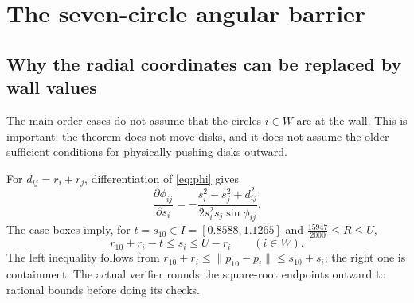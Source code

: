 \documentclass[11pt,a4paper]{article}
\theoremstyle{remark}
\newcommand{\Rcap}{U}
\newcommand{\norm}[1]{\lVert #1\rVert}
\begin{document}
\section{The seven-circle angular barrier}
\label{sec:barrier}

\subsection{Why the radial coordinates can be replaced by wall values}

The main order cases do not assume that the circles $i\in W$ are at the wall.
This is important: the theorem does not move disks, and it does not assume
the older sufficient conditions for physically pushing disks outward.

For $d_{ij}=r_i+r_j$, differentiation of \eqref{eq:phi} gives
\begin{equation}
 \frac{\partial\phi_{ij}}{\partial s_i}
  =-\frac{s_i^2-s_j^2+d_{ij}^2}
          {2s_i^2s_j\sin\phi_{ij}}.
 \label{eq:phi-derivative}
\end{equation}
The case boxes imply, for $t=s_{10}\in I=[0.8588,1.1265]$ and
$\frac{15947}{2000}\le R\le\Rcap$,
\[
  r_{10}+r_i-t\le s_i\le \Rcap-r_i
       \qquad(i\in W).
 \label{eq:main-radial-box}
\]
The left inequality follows from
$r_{10}+r_i\le\norm{p_{10}-p_i}\le s_{10}+s_i$; the right one is
containment.  The actual verifier rounds the square-root endpoints outward
to rational bounds before doing its checks.
\end{document}
